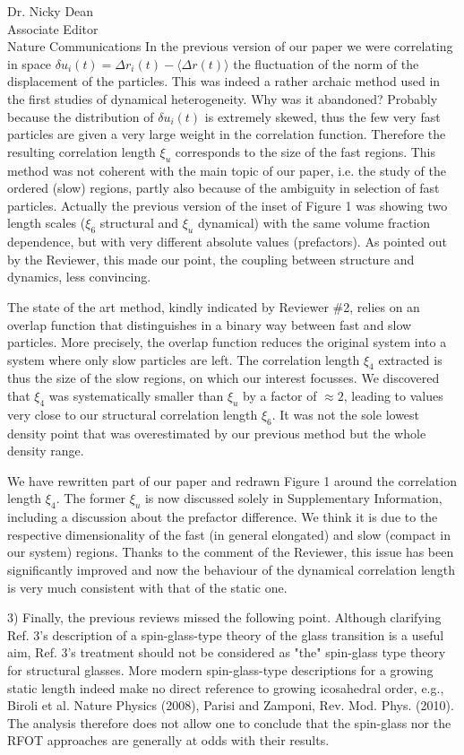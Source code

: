 \documentclass[a4paper, rebuttal, parskip=true, firsthead=false, fromemail=true, foldmarks=false]{scrlttr2}
\begin{document}
\begin{letter}{Dr. Nicky Dean\\
Associate Editor\\
Nature Communications}
In the previous version of our paper we were correlating in space $\delta u_i(t) = \Delta r_i(t)-\langle\Delta r(t)\rangle$ the fluctuation of the norm of the displacement of the particles. This was indeed a rather archaic method used in the first studies of dynamical heterogeneity. Why was it abandoned? Probably because the distribution of $\delta u_i(t)$ is extremely skewed, thus the few very fast particles are given a very large weight in the correlation function. Therefore the resulting correlation length $\xi_u$ corresponds to the size of the fast regions. This method was not coherent with the main topic of our paper, i.e. the study of the ordered (slow) regions, partly also because of the ambiguity in selection of fast particles. Actually the previous version of the inset of Figure 1 was showing two length scales ($\xi_6$ structural and $\xi_u$ dynamical) with the same volume fraction dependence, but with very different absolute values (prefactors). As pointed out by the Reviewer, this made our point, the coupling between structure and dynamics, less convincing.

The state of the art method, kindly indicated by Reviewer \#2, relies on an overlap function that distinguishes in a binary way between fast and slow particles. More precisely, the overlap function reduces the original system into a system where only slow particles are left. The correlation length $\xi_4$ extracted is thus the size of the slow regions, on which our interest focusses. We discovered that $\xi_4$ was systematically smaller than $\xi_u$ by a factor of $\approx 2$, leading to values very close to our structural correlation length $\xi_6$. It was not the sole lowest density point that was overestimated by our previous method but the whole density range.

We have rewritten part of our paper and redrawn Figure 1 around the correlation length $\xi_4$. The former $\xi_u$ is now discussed solely in Supplementary Information, including a discussion about the prefactor difference. We think it is due to the respective dimensionality of the fast (in general elongated) and slow (compact in our system) regions.
Thanks to the comment of the Reviewer, this issue has been significantly improved and now the behaviour of the dynamical correlation length is very much consistent with that 
of the static one. 

\begin{quotationi}
3) Finally, the previous reviews missed the following point. Although clarifying Ref. 3's description of a spin-glass-type theory of the glass transition is a useful aim, Ref. 3's treatment should not be considered as "the" spin-glass type theory for structural glasses. More modern spin-glass-type descriptions for a growing static length indeed make no direct reference to growing icosahedral order, e.g., Biroli et al. Nature Physics (2008), Parisi and Zamponi, Rev. Mod. Phys. (2010). The analysis therefore does not allow one to conclude that the spin-glass nor the RFOT approaches are generally at odds with their results.
\end{quotationi}


\end{letter}
\end{document}
